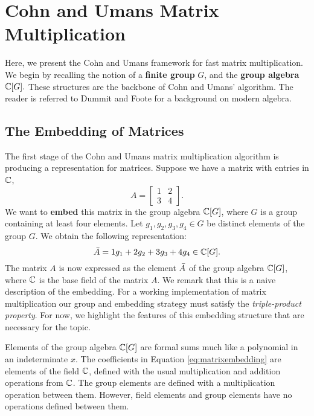 \documentclass[../thesis.tex]{subfiles}
\begin{document}
\section{Cohn and Umans Matrix Multiplication}\label{sec:CandU}
Here, we present the Cohn and Umans \cite{CohnOld}\cite{CohnNew} framework for fast matrix multiplication. We begin by recalling the notion of a \textbf{finite group} $G$, and the \textbf{group algebra} $\mathbb{C}[G].$ These structures are the backbone of Cohn and Umans' algorithm. The reader is referred to Dummit and Foote \cite{abs} for a background on modern algebra. 

\subsection{The Embedding of Matrices}
The first stage of the Cohn and Umans matrix multiplication algorithm is producing a representation for matrices. Suppose we have a matrix with entries in $\mathbb{C}$,
\begin{equation*}
    A = \begin{bmatrix}1 & 2 \\ 3 & 4\end{bmatrix}.
\end{equation*}
We want to \textbf{embed} this matrix in the group algebra $\mathbb{C}[G]$, where $G$ is a group containing at least four elements. Let $g_1,g_2,g_3,g_4\in G$ be distinct elements of the group $G$. We obtain the following representation:
\begin{equation}\label{eq:matrixembedding}
    \Bar{A} = 1g_1 + 2g_2 + 3g_3 + 4g_4\in\mathbb{C}[G].
\end{equation}
The matrix $A$ is now expressed as the element $\Bar{A}$ of the group algebra $\mathbb{C}[G]$, where $\mathbb{C}$ is the base field of the matrix $A.$ We remark that this is a naive description of the embedding. For a working implementation of matrix multiplication our group and embedding strategy must satisfy the \textit{triple-product property}. For now, we highlight the features of this embedding structure that are necessary for the topic.

Elements of the group algebra $\mathbb{C}[G]$ are formal sums much like a polynomial in an indeterminate $x.$ The coefficients in Equation \ref{eq:matrixembedding} are elements of the field $\mathbb{C}$, defined with the usual multiplication and addition operations from $\mathbb{C}$. The group elements are defined with a multiplication operation between them. However, field elements and group elements have no operations defined between them. 
\end{document}
